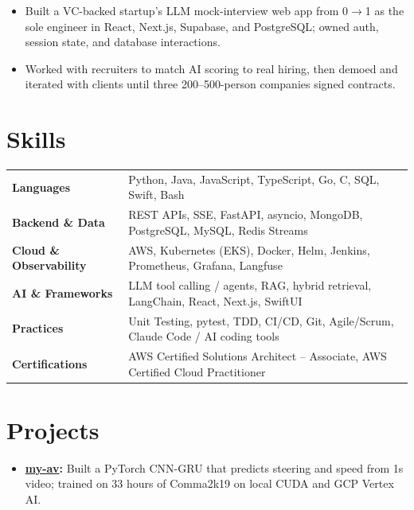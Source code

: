 \documentclass[11pt, letterpaper]{article}
\begin{document}
\vspace{1pt}
\begin{itemize}
  \item Built a VC-backed startup's LLM mock-interview web app from 0$\to$1 as the sole engineer in React, Next.js, Supabase, and PostgreSQL; owned auth, session state, and database interactions.
  \item Worked with recruiters to match AI scoring to real hiring, then demoed and iterated with clients until three 200--500-person companies signed contracts.
\end{itemize}

\section{Skills}
\begin{tabularx}{\textwidth}{@{}l @{\hspace{7pt}} >{\raggedright\arraybackslash}X@{}}
  \textbf{Languages} & Python, Java, JavaScript, TypeScript, Go, C, SQL, Swift, Bash \\[1pt]
  \textbf{Backend \& Data} & REST APIs, SSE, FastAPI, asyncio, MongoDB, PostgreSQL, MySQL, Redis Streams \\[1pt]
  \textbf{Cloud \& Observability} & AWS, Kubernetes (EKS), Docker, Helm, Jenkins, Prometheus, Grafana, Langfuse \\[1pt]
  \textbf{AI \& Frameworks} & LLM tool calling / agents, RAG, hybrid retrieval, LangChain, React, Next.js, SwiftUI \\[1pt]
  \textbf{Practices} & Unit Testing, pytest, TDD, CI/CD, Git, Agile/Scrum, Claude Code / AI coding tools \\[1pt]
  \textbf{Certifications} & AWS Certified Solutions Architect -- Associate, AWS Certified Cloud Practitioner \\
\end{tabularx}

\section{Projects}
\begin{itemize}
  \item \textbf{\href{https://github.com/lordphone/my-av}{my-av}:} Built a PyTorch CNN-GRU that predicts steering and speed from 1s video; trained on 33 hours of Comma2k19 on local CUDA and GCP Vertex AI.
\end{itemize}
\end{document}
